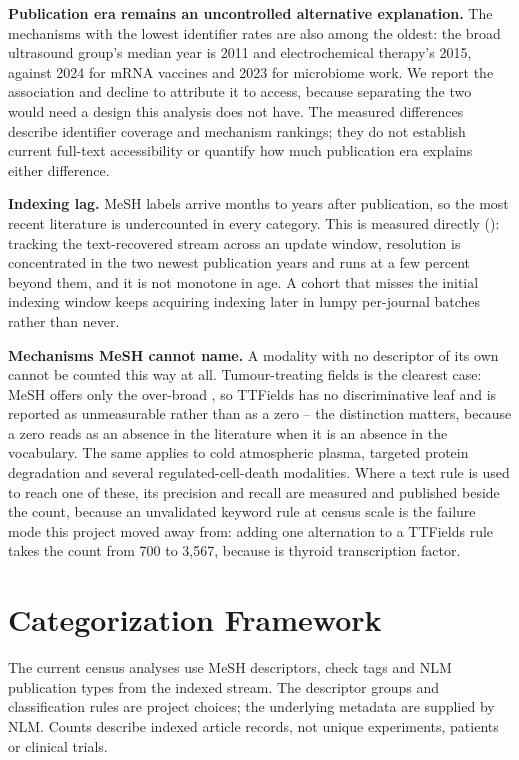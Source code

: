\documentclass[11pt,twoside,openright]{report}
\begin{document}
\textbf{Publication era remains an uncontrolled alternative explanation.}
The mechanisms with the lowest identifier rates are also among the oldest:
the broad ultrasound group's median year is 2011 and
electrochemical therapy's 2015, against 2024 for mRNA vaccines and 2023 for
microbiome work. We report the association and decline to attribute it to
access, because separating the two would need a design this analysis does not
have. The measured differences describe identifier coverage and mechanism
rankings; they do not establish current full-text accessibility or quantify
how much publication era explains either difference.

\textbf{Indexing lag.} MeSH labels arrive months to years after publication, so the
most recent literature is undercounted in every category. This is measured
directly (): tracking the text-recovered
stream across an update window, resolution is concentrated in the two newest
publication years and runs at a few percent beyond them, and it is not monotone
in age. A cohort that misses the initial indexing window keeps acquiring
indexing later in lumpy per-journal batches rather than never.

\textbf{Mechanisms MeSH cannot name.} A modality with no descriptor of its own
cannot be counted this way at all. Tumour-treating fields is the clearest case:
MeSH offers only the over-broad , so TTFields has
no discriminative leaf and is reported as unmeasurable rather than as a zero --
the distinction matters, because a zero reads as an absence in the literature
when it is an absence in the vocabulary. The same applies to cold atmospheric
plasma, targeted protein degradation and several regulated-cell-death
modalities. Where a text rule is used to reach one of these, its precision and
recall are measured and published beside the count, because an unvalidated
keyword rule at census scale is the failure mode this project moved away from:
adding one alternation to a TTFields rule takes the count from 700 to 3,567,
because  is thyroid transcription factor.

\section{Categorization Framework}

The current census analyses use MeSH descriptors, check tags and NLM publication types from the indexed stream. The descriptor groups and classification rules are project choices; the underlying metadata are supplied by NLM. Counts describe indexed article records, not unique experiments, patients or clinical trials.
\end{document}
